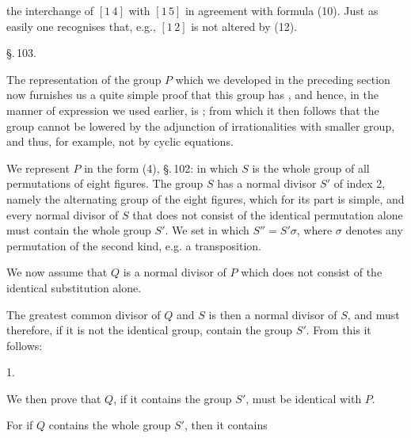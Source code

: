 
the interchange of $[1\,4]$ with $[1\,5]$ in agreement with formula (10). Just as easily one recognises that, e.g., $[1\,2]$ is not altered by (12).

\begin{center}
\S.\,103.

\end{center}

The representation of the group $P$ which we developed in the preceding section now furnishes us a quite simple proof that this group has , and hence, in the manner of expression we used earlier, is ; from which it then follows that the group cannot be lowered by the adjunction of irrationalities with smaller group, and thus, for example, not by cyclic equations.

We represent $P$ in the form (4), \S.\,102:
in which $S$ is the whole group of all permutations of eight figures. The group $S$ has a normal divisor $S'$ of index 2, namely the alternating group of the eight figures, which for its part is simple, and every normal divisor of $S$ that does not consist of the identical permutation alone must contain the whole group $S'$. We set
in which $S'' = S'\sigma$, where $\sigma$ denotes any permutation of the second kind, e.g. a transposition.

We now assume that $Q$ is a normal divisor of $P$ which does not consist of the identical substitution alone.

The greatest common divisor of $Q$ and $S$ is then a normal divisor of $S$, and must therefore, if it is not the identical group, contain the group $S'$. From this it follows:

1.\ 

We then prove that $Q$, if it contains the group $S'$, must be identical with $P$.

For if $Q$ contains the whole group $S'$, then it contains

